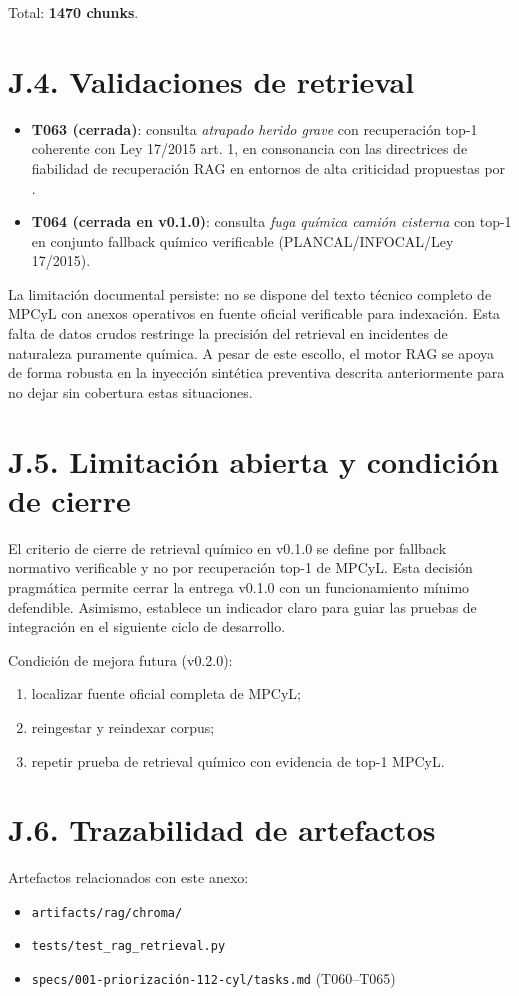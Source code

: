 Total: \textbf{1470 chunks}.

\section*{J.4. Validaciones de retrieval}

\begin{itemize}
    \item \textbf{T063 (cerrada)}: consulta \textit{atrapado herido grave} con
    recuperación top-1 coherente con Ley 17/2015 art. 1, en consonancia con las directrices de fiabilidad de recuperación RAG en entornos de alta criticidad propuestas por .
    \item \textbf{T064 (cerrada en v0.1.0)}: consulta
    \textit{fuga química camión cisterna} con top-1 en conjunto fallback químico
    verificable (PLANCAL/INFOCAL/Ley 17/2015).
\end{itemize}

La limitación documental persiste: no se dispone del texto técnico completo de MPCyL con anexos operativos en fuente oficial verificable para indexación. Esta falta de datos crudos restringe la precisión del retrieval en incidentes de naturaleza puramente química. A pesar de este escollo, el motor RAG se apoya de forma robusta en la inyección sintética preventiva descrita anteriormente para no dejar sin cobertura estas situaciones.

\section*{J.5. Limitación abierta y condición de cierre}

El criterio de cierre de retrieval químico en v0.1.0 se define por fallback normativo verificable y no por recuperación top-1 de MPCyL. Esta decisión pragmática permite cerrar la entrega v0.1.0 con un funcionamiento mínimo defendible. Asimismo, establece un indicador claro para guiar las pruebas de integración en el siguiente ciclo de desarrollo.

Condición de mejora futura (v0.2.0):

\begin{enumerate}
    \item localizar fuente oficial completa de MPCyL;
    \item reingestar y reindexar corpus;
    \item repetir prueba de retrieval químico con evidencia de top-1 MPCyL.
\end{enumerate}

\section*{J.6. Trazabilidad de artefactos}

Artefactos relacionados con este anexo:

\begin{itemize}
    \item \texttt{artifacts/rag/chroma/}
    \item \texttt{tests/test\_rag\_retrieval.py}
    \item \texttt{specs/001-priorización-112-cyl/tasks.md} (T060--T065)
\end{itemize}
